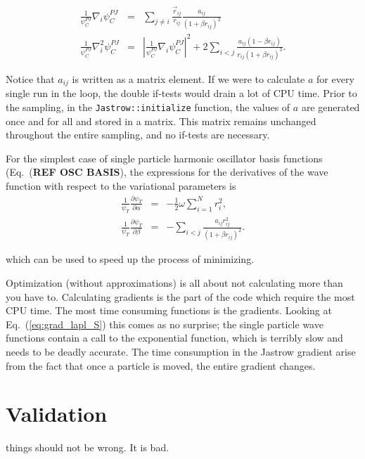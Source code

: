 \begin{eqnarray}
 \frac{1}{\psi_C^{PJ}}\nabla_i \psi_C^{PJ} &=& \displaystyle\sum_{j\ne i} \frac{\vec r_{ij}}{r_{ij}}\frac{a_{ij}}{(1+\beta r_{ij})^2} \\
\label{eq:grad_jast}
 \frac{1}{\psi_C^{PJ}}\nabla_i^2 \psi_C^{PJ} &=& \left|\frac{1}{\psi_C^{PJ}}\nabla_i \psi_C^{PJ}\right|^2 + 2\displaystyle\sum_{i < j} \frac{a_{ij}(1 - \beta r_{ij})}{r_{ij}(1 + \beta r_{ij})^3}. \nonumber
\label{eq:lapl_jastrow}
\end{eqnarray}

Notice that $a_{ij}$ is written as a matrix element. If we were to calculate $a$ for every single run in the loop, the double if-tests would drain a lot of CPU time. Prior to the sampling, in the \verb+Jastrow::initialize+ function, the values of $a$ are generated once and for all and stored in a matrix. This matrix remains unchanged throughout the entire sampling, and no if-tests are necessary.

For the simplest case of single particle harmonic oscillator basis functions (Eq.~(\textbf{REF OSC BASIS}), the expressions for the derivatives of the wave function with respect to the variational parameters is
\begin{eqnarray}
\frac{1}{\psi_T}\frac{\partial\psi_T}{\partial\alpha} &=& -\frac{1}{2}\omega\displaystyle\sum_{i=1}^N r_i^2, \\
\frac{1}{\psi_T}\frac{\partial\psi_T}{\partial\beta} &=& -\displaystyle\sum_{i<j}\frac{a_{ij}r_{ij}^2}{(1+\beta r_{ij})^2}.
\label{eq:CGM_derivatives}
\end{eqnarray}

which can be used to speed up the process of minimizing.


Optimization (without approximations) is all about not calculating more than you have to. Calculating gradients is the part of the code which require the most CPU time. The most time consuming functions is the gradients. Looking at Eq.~(\ref{eq:grad_lapl_S}) this comes as no surprise; the single particle wave functions contain a call to the exponential function, which is terribly slow and needs to be deadly accurate. The time consumption in the Jastrow gradient arise from the fact that once a particle is moved, the entire gradient changes. 

\section{Validation}

things should not be wrong. It is bad.


